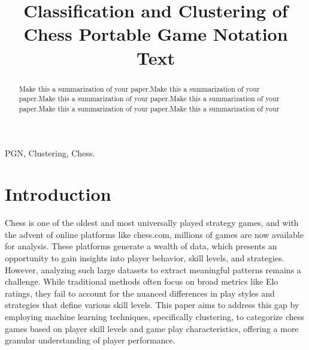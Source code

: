 \documentclass[conference]{IEEEtran}
\begin{document}
\title{Classification and Clustering of Chess Portable Game Notation Text\\
}

\author{
\and
{}


}

\maketitle

\begin{abstract}
Make this a summarization of your paper.Make this a summarization of your paper.Make this a summarization of your paper.Make this a summarization of your paper.Make this a summarization of your paper.Make this a summarization of your 
\end{abstract}

\begin{IEEEkeywords}
PGN, Clustering, Chess.
\end{IEEEkeywords}

\section{Introduction}
Chess is one of the oldest and most universally played strategy games, and with the advent of online platforms like chess.com, millions of games are now available for analysis. These platforms generate a wealth of data, which presents an opportunity to gain insights into player behavior, skill levels, and strategies. However, analyzing such large datasets to extract meaningful patterns remains a challenge. While traditional methods often focus on broad metrics like Elo ratings, they fail to account for the nuanced differences in play styles and strategies that define various skill levels. This paper aims to address this gap by employing machine learning techniques, specifically clustering, to categorize chess games based on player skill levels and game play characteristics, offering a more granular understanding of player performance.
\end{document}
